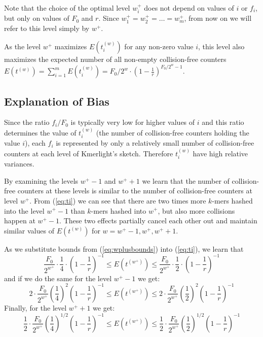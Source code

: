 \medskip

Note that the choice of the optimal level $w_i^+$ does not depend on values of $i$ or $f_i$,
but only on values of $F_0$ and $r$. Since $w_1^+ = w_2^+ = \dots = w_m^+$, from now on 
we will refer to this level simply by $w^+$.

As the level $w^+$ maximizes $E(t_i^{(w)})$ for any non-zero value $i$, 
this level also maximizes the expected number of all non-empty collision-free counters
$E(t^{(w)}) = \sum_{i=1}^m E(t_i^{(w)}) = F_0 / 2^w \cdot
\left(1 - \frac{1}{r}\right)^{F_0/2^w - 1} $.


\subsection{Explanation of Bias}
Since the ratio $f_i / F_0$ is typically very low for higher values of $i$ and this
ratio determines the value of $t_i^{(w)}$ (the number of collision-free counters holding
the value $i$), each $f_i$ is represented by only a relatively small number of collision-free
counters at each level of Kmerlight's sketch. Therefore $t_i^{(w)}$ have high relative variances. 


By examining the levels $w^+-1$ and $w^++1$ we learn that the number of collision-free
counters at these levels is similar to the number of collision-free counters at level $w^+$. 
From (\ref{eq:ti}) we can see that there are two times more $k$-mers hashed into the level $w^+-1$
than $k$-mers hashed into $w^+$, but also more collisions happen at $w^+-1$. These
two effects partially cancel each other out and maintain similar values of $E(t^{(w)})$
for $w = w^+-1, w^+, w^++1$.

As we substitute bounds from (\ref{eq:wplusbounds}) into (\ref{eq:ti}), we learn that
$$ 
\frac{F_0}{2^{w^+}} \cdot \frac{1}{4} \cdot \left(1 - \frac{1}{r}\right)^{-1}
\leq E(t^{(w^+)}) \leq 
\frac{F_0}{2^{w^+}} \cdot \frac{1}{2} \cdot \left(1 - \frac{1}{r}\right)^{-1}
$$
and if we do the same for the level $w^+-1$ we get:
$$ 
2 \cdot \frac{F_0}{2^{w^+}} \left(\frac{1}{4}\right)^2 \left(1 - \frac{1}{r}\right)^{-1}
\leq E(t^{(w^+)}) \leq 
2 \cdot \frac{F_0}{2^{w^+}} \left(\frac{1}{2}\right)^2 \left(1 - \frac{1}{r}\right)^{-1}
$$
Finally, for the level $w^++1$ we get:
$$ 
\frac{1}{2} \cdot \frac{F_0}{2^{w^+}} \left(\frac{1}{4}\right)^{1/2} \left(1 - \frac{1}{r}\right)^{-1}
\leq E(t^{(w^+)}) \leq 
\frac{1}{2} \cdot \frac{F_0}{2^{w^+}} \left(\frac{1}{2}\right)^{1/2} \left(1 - \frac{1}{r}\right)^{-1}
$$


